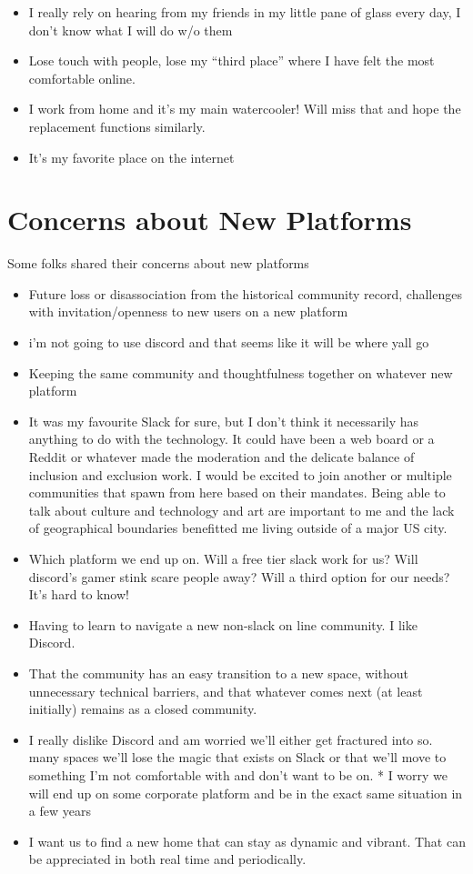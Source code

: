 \documentclass[
]{book}
\providecommand{\tightlist}{%
  \setlength{\itemsep}{0pt}\setlength{\parskip}{0pt}}
\begin{document}
\begin{itemize}
\tightlist
\item
  I really rely on hearing from my friends in my little pane of glass every day, I don't know what I will do w/o them
\item
  Lose touch with people, lose my ``third place'' where I have felt the most comfortable online.
\item
  I work from home and it's my main watercooler! Will miss that and hope the replacement functions similarly.
\item
  It's my favorite place on the internet
\end{itemize}

\section{Concerns about New Platforms}\label{concerns-about-new-platforms}

Some folks shared their concerns about new platforms

\begin{itemize}
\tightlist
\item
  Future loss or disassociation from the historical community record, challenges with invitation/openness to new users on a new platform
\item
  i'm not going to use discord and that seems like it will be where yall go
\item
  Keeping the same community and thoughtfulness together on whatever new platform
\item
  It was my favourite Slack for sure, but I don't think it necessarily has anything to do with the technology. It could have been a web board or a Reddit or whatever made the moderation and the delicate balance of inclusion and exclusion work. I would be excited to join another or multiple communities that spawn from here based on their mandates. Being able to talk about culture and technology and art are important to me and the lack of geographical boundaries benefitted me living outside of a major US city.
\item
  Which platform we end up on. Will a free tier slack work for us? Will discord's gamer stink scare people away? Will a third option for our needs? It's hard to know!
\item
  Having to learn to navigate a new non-slack on line community. I like Discord.
\item
  That the community has an easy transition to a new space, without unnecessary technical barriers, and that whatever comes next (at least initially) remains as a closed community.
\item
  I really dislike Discord and am worried we'll either get fractured into so. many spaces we'll lose the magic that exists on Slack or that we'll move to something I'm not comfortable with and don't want to be on. * I worry we will end up on some corporate platform and be in the exact same situation in a few years
\item
  I want us to find a new home that can stay as dynamic and vibrant. That can be appreciated in both real time and periodically.
\end{itemize}
\end{document}
